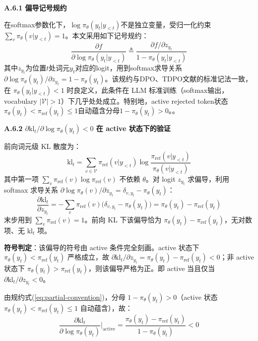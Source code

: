 \documentclass[lettersize,journal]{IEEEtran}
\begin{document}
\textbf{A.6.1 偏导记号规约}

在softmax参数化下，$\log\pi_\theta(y_t|y_{<t})$不是独立变量，受归一化约束$\sum_v \pi_\theta(v|y_{<t}) = 1$。本文采用如下记号规约：
\begin{equation}\label{eq:partial-convention}
\frac{\partial f}{\partial \log\pi_\theta(y_t|y_{<t})} \triangleq \frac{\partial f/\partial z_{y_t}}{1 - \pi_\theta(y_t|y_{<t})}
\end{equation}
其中$z_{y_t}$为位置$t$处词元$y_t$对应的logit，用到softmax求导关系$\partial \log\pi_\theta(y_t)/\partial z_{y_t} = 1 - \pi_\theta(y_t)$。该规约与DPO\cite{rafailov2023direct}、TDPO\cite{zeng2024token}文献的标准记法一致，在 $\pi_\theta(y_t|y_{<t}) < 1$ 时良定义，此条件在 LLM 标准训练（softmax输出，vocabulary $|\mathcal{V}| > 1$）下几乎处处成立。特别地，active rejected token状态$\pi_\theta(y_t) < \pi_{\text{ref}}(y_t) \leq 1$自动蕴含分母$1 - \pi_\theta(y_t) > 0$。。

\textbf{A.6.2 $\partial \text{kl}_t/\partial \log\pi_\theta(y_t) < 0$ 在 active 状态下的验证}
 
前向词元级 KL 散度为：
\begin{equation}
\text{kl}_t = \sum_{v \in \mathcal{V}} \pi_{\text{ref}}(v|y_{<t}) \log\frac{\pi_{\text{ref}}(v|y_{<t})}{\pi_\theta(v|y_{<t})}
\end{equation}
其中第一项 $\sum_v \pi_{\text{ref}}(v)\log\pi_{\text{ref}}(v)$ 不依赖 $\theta$。对 logit $z_{y_t}$ 求偏导，利用 softmax 求导关系 $\partial \log\pi_\theta(v)/\partial z_{y_t} = \delta_{v,y_t} - \pi_\theta(y_t)$：
\begin{equation}\label{eq:dkl-dz}
\frac{\partial \text{kl}_t}{\partial z_{y_t}} = -\sum_v \pi_{\text{ref}}(v)\bigl(\delta_{v,y_t} - \pi_\theta(y_t)\bigr) = \pi_\theta(y_t) - \pi_{\text{ref}}(y_t)
\end{equation}
末步用到 $\sum_v \pi_{\text{ref}}(v) = 1$。前向 KL 下该偏导恰为 $\pi_\theta(y_t) - \pi_{\text{ref}}(y_t)$，无对数项、无 $\text{kl}_t$ 项。
 
\textbf{符号判定}：该偏导的符号由 active 条件完全刻画。active 状态下 $\pi_\theta(y_t) < \pi_{\text{ref}}(y_t)$ 严格成立，故 $\partial \text{kl}_t/\partial z_{y_t} = \pi_\theta(y_t) - \pi_{\text{ref}}(y_t) < 0$；非 active 状态下 $\pi_\theta(y_t) > \pi_{\text{ref}}(y_t)$，则该偏导严格为正。即 active 当且仅当 $\partial \text{kl}_t/\partial z_{y_t} < 0$。
 
由规约式(\ref{eq:partial-convention})，分母 $1 - \pi_\theta(y_t) > 0$（active 状态 $\pi_\theta(y_t) < \pi_{\text{ref}}(y_t) \leq 1$ 自动蕴含），故：
\begin{equation}
\frac{\partial \text{kl}_t}{\partial \log\pi_\theta(y_t)}\bigg|_{\text{active}} = \frac{\pi_\theta(y_t) - \pi_{\text{ref}}(y_t)}{1 - \pi_\theta(y_t)} < 0
\end{equation}
\end{document}
